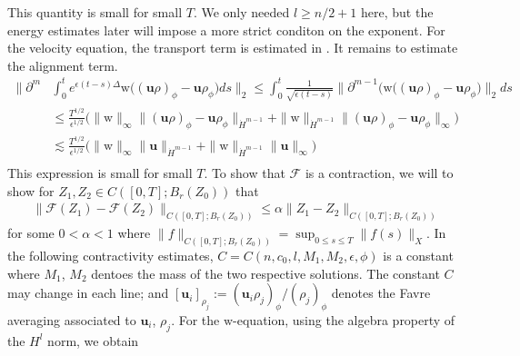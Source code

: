 \documentclass[11pt,letterpaper]{amsart}
\theoremstyle{plain}
\theoremstyle{definition}
\theoremstyle{remark}
\renewcommand{\geq}{\geqslant}
\renewcommand{\leq}{\leqslant}
\def\u{\textbf{u}}
\def \wt {\mathrm{w}}
\begin{document}
This quantity is small for small $T$. 
We only needed $l \geq n/2 + 1$ here, but 
the energy estimates later will impose a more strict conditon on the exponent. 
For the velocity equation, the transport term is estimated in \cite{Sbook}. It remains to estimate the alignment term.  
\begin{align*}
    \Big\| \partial^m
        &\int_0^t e^{\epsilon(t-s) \Delta} \wt \big( (\u\rho)_{\phi} - \u \rho_{\phi} \big) ds \Big\|_2
            \leq \int_0^t \frac{1}{\sqrt{\epsilon(t-s)}} \big\| \partial^{m-1} \big( \wt \big( (\u\rho)_{\phi} - \u \rho_{\phi} \big) \big\|_2 ds \\
            &\leq \frac{T^{1/2}}{\epsilon^{1/2}} \Big( \| \wt \|_{\infty} \|(\u\rho)_{\phi} - \u \rho_{\phi}\|_{\dot{H}^{m-1}} + \| \wt \|_{\dot{H}^{m-1}} \|(\u\rho)_{\phi} - \u \rho_{\phi}\|_{\infty} \Big) \\
            &\lesssim \frac{T^{1/2}}{\epsilon^{1/2}} \Big( \| \wt \|_{\infty} \|\u\|_{\dot{H}^{m-1}} + \| \wt \|_{\dot{H}^{m-1}} \|\u\|_{\infty} \Big) \\
        \end{align*}
This expression is small for small $T$.  
To show that $\mathcal{F}$ is a contraction, we will to show for $Z_1, Z_2 \in C([0,T]; B_r(Z_0))$
that 
\begin{align*}
    \| \mathcal{F}(Z_1) - \mathcal{F}(Z_2) \|_{C([0,T]; B_{r}(Z_0))} \leq \alpha \|Z_1 - Z_2\|_{C([0,T]; B_{r}(Z_0))}
\end{align*}
for some $0 < \alpha < 1$ where $\|f\|_{C([0,T]; B_{r}(Z_0))} = \sup_{0 \leq s \leq T} \|f(s)\|_X$.
In the following contractivity estimates, $C = C(n, c_0, l, M_1, M_2, \epsilon, \phi)$ is a constant where 
$M_1$, $M_2$  dentoes the mass of the two respective solutions. The constant $C$ may change in each line; 
and $[\u_i]_{\rho_j} := (\u_i \rho_j)_{\phi}/(\rho_j)_{\phi}$ denotes the Favre averaging
associated to $\u_i$, $\rho_j$.
For the $\wt$-equation, using the algebra property of the $H^l$ norm, we obtain
\end{document}
